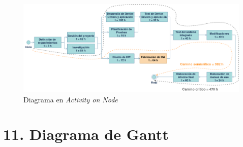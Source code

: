 \documentclass[
11pt, %
]{charter}
\begin{document}
\begin{figure}[htpb]
\centering 
\includegraphics[width=1\textwidth]{./Figuras/Activity On Node.png}
\caption{Diagrama en \textit{Activity on Node}}
\label{fig:AoN}
\end{figure}

\vspace{25px}



\section{11. Diagrama de Gantt}
\label{sec:gantt}
\end{document}
